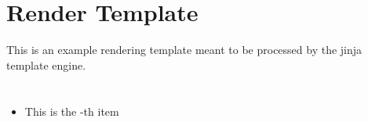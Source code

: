 \documentclass{article}
\begin{document}
    \section{Render Template}
    This is an example rendering template meant to be processed by the jinja template engine.

    \section{}
    \begin{itemize}
        \item This is the -th item

    \end{itemize}
\end{document}
